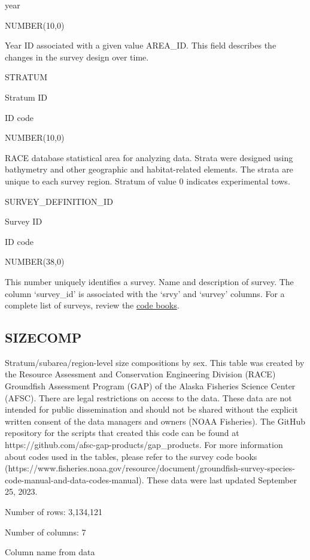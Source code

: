 \documentclass[
  letterpaper,
  oneside,
  open=any]{scrbook}
\begin{document}
year

NUMBER(10,0)

Year ID associated with a given value AREA\_ID. This field describes the
changes in the survey design over time.

STRATUM

Stratum ID

ID code

NUMBER(10,0)

RACE database statistical area for analyzing data. Strata were designed
using bathymetry and other geographic and habitat-related elements. The
strata are unique to each survey region. Stratum of value 0 indicates
experimental tows.

SURVEY\_DEFINITION\_ID

Survey ID

ID code

NUMBER(38,0)

This number uniquely identifies a survey. Name and description of
survey. The column `survey\_id' is associated with the `srvy' and
`survey' columns. For a complete list of surveys, review the
\href{https://www.fisheries.noaa.gov/resource/document/groundfish-survey-species-code-manual-and-data-codes-manual}{code
books}.

\hypertarget{sizecomp}{%
\subsection{SIZECOMP}\label{sizecomp}}

Stratum/subarea/region-level size compositions by sex. This table was
created by the Resource Assessment and Conservation Engineering Division
(RACE) Groundfish Assessment Program (GAP) of the Alaska Fisheries
Science Center (AFSC). There are legal restrictions on access to the
data. These data are not intended for public dissemination and should
not be shared without the explicit written consent of the data managers
and owners (NOAA Fisheries). The GitHub repository for the scripts that
created this code can be found at
https://github.com/afsc-gap-products/gap\_products. For more information
about codes used in the tables, please refer to the survey code books
(https://www.fisheries.noaa.gov/resource/document/groundfish-survey-species-code-manual-and-data-codes-manual).
These data were last updated September 25, 2023.

Number of rows: 3,134,121

Number of columns: 7

Column name from data
\end{document}
